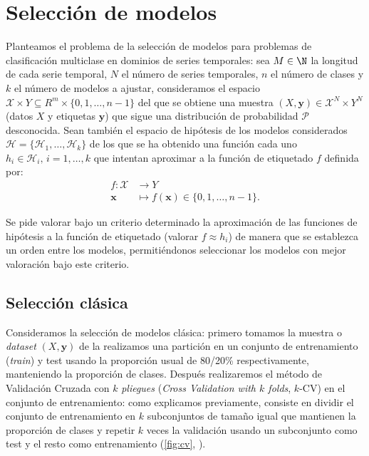 \chapter{Selección de modelos}\label{ch:pv-seleccion}

Planteamos el problema de la selección de modelos para problemas de clasificación multiclase en dominios de series temporales: sea $M \in \N$ la longitud de cada serie temporal, $N$ el número de series temporales, $n$ el número de clases y $k$ el número de modelos a ajustar, consideramos el espacio $\mathcal{X} \times Y \subseteq R^m \times \{0, 1, \ldots, n - 1\} $ del que se obtiene una muestra $(X, \textbf{y}) \in \mathcal{X}^N \times Y^N$ (datos $X$ y etiquetas $\textbf{y}$) que sigue una distribución de probabilidad $\mathcal{P}$ desconocida. Sean también el espacio de hipótesis de los modelos considerados $\mathcal{H} = \{\mathcal{H}_1, \ldots, \mathcal{H}_k\}$ de los que se ha obtenido una función cada uno $h_i \in \mathcal{H}_i, \, i = 1, \ldots, k$ que intentan aproximar a la función de etiquetado $f$ definida por:
\begin{align*}
  f : \mathcal{X} & \to Y \\
  \textbf{x} & \mapsto f(\textbf{x}) \in \{0, 1, \ldots, n-1\}.
\end{align*}

Se pide valorar bajo un criterio determinado la aproximación de las funciones de hipótesis a la función de etiquetado (valorar $f \approx h_i$) de manera que se establezca un orden entre los modelos, permitiéndonos seleccionar los modelos con mejor valoración bajo este criterio.

\section{Selección clásica}

Consideramos la selección de modelos clásica: primero tomamos la muestra o \emph{dataset} $(X, \textbf{y})$ de la realizamos una partición en un conjunto de entrenamiento (\emph{train}) y test usando la proporción usual de 80/20\% respectivamente, manteniendo la proporción de clases. Después realizaremos el método de Validación Cruzada con $k$ \emph{pliegues} (\emph{Cross Validation with $k$ folds}, $k$-CV) \cite{stone1974cross} en el conjunto de entrenamiento: como explicamos previamente, consiste en dividir el conjunto de entrenamiento en $k$ subconjuntos de tamaño igual que mantienen la proporción de clases y repetir $k$ veces la validación usando un subconjunto como test y el resto como entrenamiento (\autoref{fig:cv}, \cite{niu2018rfamyloid}).

